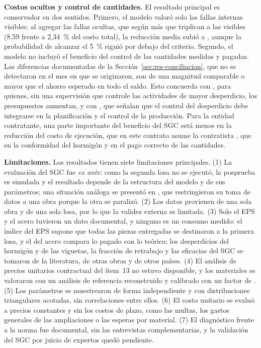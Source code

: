 \textbf{Costos ocultos y control de cantidades.} El resultado principal es conservador en dos sentidos. Primero, el modelo valoró solo las fallas internas visibles; al agregar las fallas ocultas, que según \textcite[p.~5421]{khadim2023} más que triplican a las visibles (8,59 frente a 2,34~\% del costo total), la reducción media subió a \rMediaOcultos{}, aunque la probabilidad de alcanzar el 5~\% siguió por debajo del criterio. Segundo, el modelo no incluyó el beneficio del control de las cantidades medidas y pagadas. Las diferencias documentadas de la Sección~\ref{sec:res-conciliacion}, que no se detectaron en el mes en que se originaron, son de una magnitud comparable o mayor que el ahorro esperado en todo el saldo. Esto concuerda con \textcite[p.~69]{rojas2018}, para quienes, sin una supervisión que controle las actividades de mayor desperdicio, los presupuestos aumentan, y con \textcite[p.~334]{formoso1999}, que señalan que el control del desperdicio debe integrarse en la planificación y el control de la producción. Para la entidad contratante, una parte importante del beneficio del SGC está menos en la reducción del costo de ejecución, que en este contrato asume la contratista \parencite[p.~92]{uatf2025pao2}, que en la conformidad del hormigón y en el pago correcto de las cantidades.

\textbf{Limitaciones.} Los resultados tienen siete limitaciones principales. (1) La evaluación del SGC fue \emph{ex ante}: como la segunda losa no se ejecutó, la posprueba es simulada y el resultado depende de la estructura del modelo y de sus parámetros; una situación análoga se presentó en \textcite[p.~60]{aguilar2016}, que restringieron su toma de datos a una obra porque la otra se paralizó. (2) Los datos provienen de una sola obra y de una sola losa, por lo que la validez externa es limitada. (3) Solo el EPS y el acero tuvieron un dato documental, y ninguno es un consumo medido: el índice del EPS supone que todas las piezas entregadas se destinaron a la primera losa, y el del acero compara lo pagado con lo teórico; los desperdicios del hormigón y de las viguetas, la fracción de retrabajo y las eficacias del SGC se tomaron de la literatura, de otras obras y de otros países. (4) El análisis de precios unitarios contractual del ítem~13 no estuvo disponible, y los materiales se valoraron con un análisis de referencia reconstruido y calibrado con un factor de \KappaTrece{}. (5) Los parámetros se muestrearon de forma independiente y con distribuciones triangulares acotadas, sin correlaciones entre ellos. (6) El costo unitario se evaluó a precios constantes y sin los costos de plazo, como las multas, los gastos generales de las ampliaciones o las esperas por material. (7) El diagnóstico frente a la norma fue documental, sin las entrevistas complementarias, y la validación del SGC por juicio de expertos quedó pendiente.

